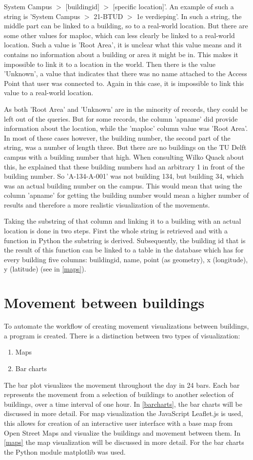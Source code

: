 System Campus $>$ [buildingid] $>$ [specific location]'. An example of such a string is 'System Campus $>$ 21-BTUD $>$ 1e verdieping'. In such a string, the middle part can be linked to a building, so to a real-world location. 
But there are some other values for maploc, which can less clearly be linked to a real-world location. Such a value is 'Root Area', it is unclear what this value means and it contains no information about a building or area it might be in. This makes it impossible to link it to a location in the world. Then there is the value 'Unknown', a value that indicates that there was no name attached to the Access Point that user was connected to. Again in this case, it is impossible to link this value to a real-world location. 

As both 'Root Area' and 'Unknown' are in the minority of records, they could be left out of the queries. But for some records, the column 'apname' did provide information about the location, while the 'maploc' column value was 'Root Area'. In most of these cases however, the building number, the second part of the string, was a number of length three. But there are no buildings on the TU Delft campus with a building number that high. When consulting Wilko Quack about this, he explained that these building numbers had an arbitrary 1 in front of the building number. So 'A-134-A-001' was not building 134, but building 34, which was an actual building number on the campus. This would mean that using the column 'apname' for getting the building number would mean a higher number of results and therefore a more realistic visualization of the movements. 

Taking the substring of that column and linking it to a building with an actual location is done in two steps. First the whole string is retrieved and with a function in Python the substring is derived. Subsequently, the building id that is the result of this function can be linked to a table in the database which has for every building five columns: buildingid, name, point (as geometry), x (longitude), y (latitude) (see in \autoref{maps}).
\section{Movement between buildings}\label{movement between buildings}
To automate the workflow of creating movement visualizations between buildings, a program is created. There is a distinction between two types of visualization:
\begin{enumerate}
\item Maps
\item Bar charts
\end{enumerate}
The bar plot visualizes the movement throughout the day in 24 bars. Each bar represents the movement from a selection of buildings to another selection of buildings, over a time interval of one hour. In \autoref{barcharts}, the bar charts will be discussed in more detail. For map visualization the JavaScript Leaflet.js is used, this allows for creation of an interactive user interface with a base map from Open Street Maps and visualize the buildings and movement between them. In \autoref{maps} the map visualization will be discussed in more detail. For the bar charts the Python module matplotlib was used.
